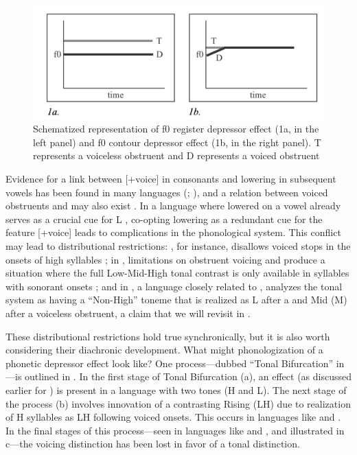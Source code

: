 \documentclass[output=paper,newtxmath,modfonts,nonflat]{langsci/langscibook}
\begin{document}
\begin{figure} 

\includegraphics[width=\textwidth]{figures/fig-lotven-1.png}  
\caption{\label{fig:lotven:samson:1} Schematized representation of f0 register depressor effect (1a, in the left panel) and f0 contour depressor effect (1b, in the right panel). T represents a voiceless obstruent and D represents a voiced obstruent}
\end{figure}


Evidence for a link between [+voice] in consonants and  lowering in subsequent vowels has been found in many languages (\citealt{Bradshaw1999}; \citealt{Tang2008}), and a relation between voiced obstruents and  may also exist \citep[5]{Yip2002}. In a  language where lowered  on a vowel already serves as a crucial cue for L , co-opting  lowering as a redundant cue for the feature [+voice] leads to complications in the phonological system. This conflict may lead to distributional restrictions: , for instance, disallows voiced stops in the onsets of high  syllables \citep{perkins2011}; in , limitations on obstruent voicing and  produce a situation where the full Low-Mid-High tonal contrast is only available in syllables with sonorant onsets \citep{Pearce2005}; and in , a language closely related to , \citet{Ansre1961} analyzes the tonal system as having a “Non-High” toneme that is realized as L after a  and Mid (M) after a voiceless obstruent, a claim that we will revisit in . 

These distributional restrictions hold true synchronically, but it is also worth considering their diachronic development. What might phonologization of a phonetic depressor effect look like? One process—dubbed “Tonal Bifurcation” in \citet{Hyman2013enlarging}—is outlined in . In the first stage of Tonal Bifurcation (a), an  effect (as discussed earlier for ) is present in a language with two  tones (H and L). The next stage of the process (b) involves innovation of a contrasting Rising (LH)  due to realization of H  syllables as LH following voiced onsets. This occurs in languages like  and  \citep{Ansre1961,Bole-Richard1983}. In the final stages of this process—seen in languages like  and  \citep{Downing2009}, and illustrated in c—the voicing distinction has been lost in favor of a tonal distinction.
\end{document}
